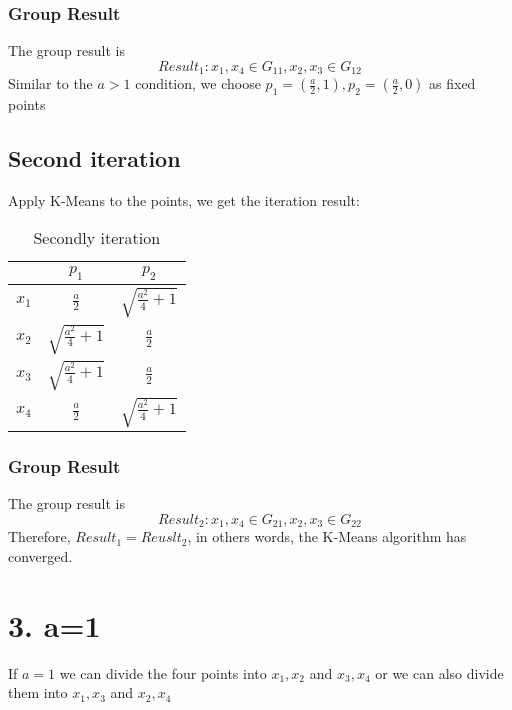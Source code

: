 \documentclass[12pt,letterpaper]{article}
\begin{document}
\subsubsection*{Group Result}The group result is
\begin{equation}\label{q2eq5}
  Result_1: x_1, x_4\in G_{11}, x_2, x_3\in G_{12}
\end{equation}
Similar to the $a>1$ condition, we choose $p_1=(\frac{a}{2},1), p_2=(\frac{a}{2},0)$ as fixed points
\newpage
\subsection*{Second iteration}
Apply K-Means to the points, we get the iteration result:
\begin{table}[!htbp]
  \centering
  \caption{Secondly iteration}
    \begin{tabular}{|c|c|c|}
    \toprule
          & $p_1$    & $p_2$ \\
    \hline
    $x_1$    & \textcolor[rgb]{1.000, 0.000, 0.000}{$\frac{a}{2}$}     & $\sqrt{\frac{a^2}{4}+1}$ \\
    \hline
    $x_2$    &   $\sqrt{\frac{a^2}{4}+1}$   & \textcolor[rgb]{1.000, 0.000, 0.000}{$\frac{a}{2}$}  \\
    \hline
    $x_3$    & $\sqrt{\frac{a^2}{4}+1}$      & \textcolor[rgb]{1.000, 0.000, 0.000}{$\frac{a}{2}$}  \\
    \hline
    $x_4$    & \textcolor[rgb]{1.000, 0.000, 0.000}{$\frac{a}{2}$}       & $\sqrt{\frac{a^2}{4}+1}$ \\
    \bottomrule
    \end{tabular}%
  \label{tab:addlabel}%
\end{table}%
\subsubsection*{Group Result}The group result is
\begin{equation}\label{q2eq5}
  Result_2: x_1, x_4\in G_{21}, x_2, x_3\in G_{22}
\end{equation}
Therefore, $Result_1=Reuslt_2$, in others words, the K-Means algorithm has converged.
\section*{3. a=1}
If $a=1$ we can divide the four points into ${x_1, x_2}$ and ${x_3, x_4}$ or we can also divide them into ${x_1, x_3}$ and ${x_2, x_4}$
\end{document}
